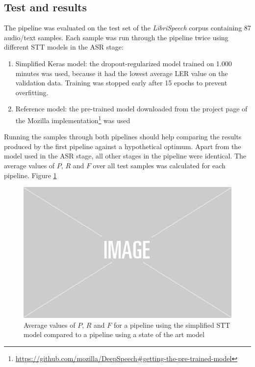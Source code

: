 \subsection{Test and results}

The pipeline was evaluated on the test set of the \textit{LibriSpeech} corpus containing 87 audio/text samples. Each sample was run through the pipeline twice using different \ac{STT} models in the \ac{ASR} stage:

\begin{enumerate}
	\item Simplified Keras model: the dropout-regularized model trained on 1.000 minutes was used, because it had the lowest average \ac{LER} value on the validation data. Training was stopped early after 15 epochs to prevent overfitting. 
	\item Reference model: the pre-trained model downloaded from the project page of the Mozilla implementation\footnote{\url{https://github.com/mozilla/DeepSpeech\#getting-the-pre-trained-model}} was used
\end{enumerate}

Running the samples through both pipelines should help comparing the results produced by the first pipeline against a hypothetical optimum. Apart from the model used in the \ac{ASR} stage, all other stages in the pipeline were identical. The average values of $P$, $R$ and $F$ over all test samples was calculated for each pipeline. Figure \ref{pipeline_boxplot_ls_en} 

\begin{figure}
	\includegraphics[width=\linewidth]{./img/placeholder.png}
	\caption{Average values of $P$, $R$ and $F$ for a pipeline using the simplified \ac{STT} model compared to a pipeline using a state of the art model}
	\label{pipeline_boxplot_ls_en}
\end{figure}
